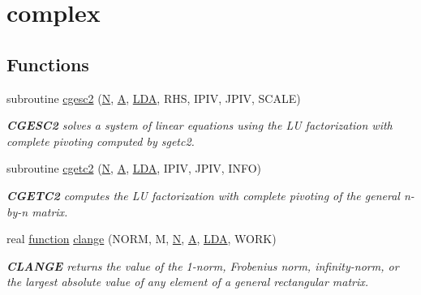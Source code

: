 \hypertarget{group__complexGEauxiliary}{}\section{complex}
\label{group__complexGEauxiliary}
\subsection*{Functions}
\begin{DoxyCompactItemize}
\item 
subroutine \hyperlink{group__complexGEauxiliary_gae8e5c5211c3b35cb3ebb10160a141e2d}{cgesc2} (\hyperlink{polmisc_8c_a0240ac851181b84ac374872dc5434ee4}{N}, \hyperlink{classA}{A}, \hyperlink{example__user_8c_ae946da542ce0db94dced19b2ecefd1aa}{L\+D\+A}, R\+H\+S, I\+P\+I\+V, J\+P\+I\+V, S\+C\+A\+L\+E)
\begin{DoxyCompactList}\small\item\em {\bfseries C\+G\+E\+S\+C2} solves a system of linear equations using the L\+U factorization with complete pivoting computed by sgetc2. \end{DoxyCompactList}\item 
subroutine \hyperlink{group__complexGEauxiliary_gabe14160a9bd237d70974c6ffda7baeba}{cgetc2} (\hyperlink{polmisc_8c_a0240ac851181b84ac374872dc5434ee4}{N}, \hyperlink{classA}{A}, \hyperlink{example__user_8c_ae946da542ce0db94dced19b2ecefd1aa}{L\+D\+A}, I\+P\+I\+V, J\+P\+I\+V, I\+N\+F\+O)
\begin{DoxyCompactList}\small\item\em {\bfseries C\+G\+E\+T\+C2} computes the L\+U factorization with complete pivoting of the general n-\/by-\/n matrix. \end{DoxyCompactList}\item 
real \hyperlink{afunc_8m_a7b5e596df91eadea6c537c0825e894a7}{function} \hyperlink{group__complexGEauxiliary_gaa4e1d57c726257bbbfe0c89ef5461c3b}{clange} (N\+O\+R\+M, M, \hyperlink{polmisc_8c_a0240ac851181b84ac374872dc5434ee4}{N}, \hyperlink{classA}{A}, \hyperlink{example__user_8c_ae946da542ce0db94dced19b2ecefd1aa}{L\+D\+A}, W\+O\+R\+K)
\begin{DoxyCompactList}\small\item\em {\bfseries C\+L\+A\+N\+G\+E} returns the value of the 1-\/norm, Frobenius norm, infinity-\/norm, or the largest absolute value of any element of a general rectangular matrix. \end{DoxyCompactList}\item 

\end{DoxyCompactItemize}
